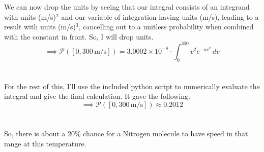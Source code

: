 \documentclass[12pt]{article}
\begin{document}
\begin{flushleft}
We can now drop the units by seeing that our integral consists of an integrand with units (m/s)$^2$ and our variable of integration having units (m/s), leading to a result with units (m/s)$^3$, cancelling out to a unitless probability when combined with the constant in front.
So, I will drop units.
$$\implies\mathcal{P}([0,300\,\text{m/s}])=3.0002\times10^{-8}\cdot\int_0^{300}v^2e^{-av^2}\,dv$$\\~\\

For the rest of this, I'll use the included python script to numerically evaluate the integral and give the final calculation. It gave the following.
$$\implies\mathcal{P}([0,300\,\text{m/s}])\approx0.2012$$\\~\\

So, there is about a 20\% chance for a Nitrogen molecule to have speed in that range at this temperature.





\end{flushleft}
\end{document}
